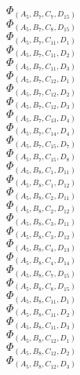\documentclass[14pt]{article}
\begin{document}
    $\Phi_{({A}_{5}, {B}_{7}, {C}_{7}, {D}_{15})}$ \\ 
    $\Phi_{({A}_{5}, {B}_{7}, {C}_{8}, {D}_{15})}$ \\ 
    $\Phi_{({A}_{5}, {B}_{7}, {C}_{11}, {D}_{1})}$ \\ 
    $\Phi_{({A}_{5}, {B}_{7}, {C}_{11}, {D}_{2})}$ \\ 
    $\Phi_{({A}_{5}, {B}_{7}, {C}_{11}, {D}_{3})}$ \\ 
    $\Phi_{({A}_{5}, {B}_{7}, {C}_{12}, {D}_{1})}$ \\ 
    $\Phi_{({A}_{5}, {B}_{7}, {C}_{12}, {D}_{2})}$ \\ 
    $\Phi_{({A}_{5}, {B}_{7}, {C}_{12}, {D}_{3})}$ \\ 
    $\Phi_{({A}_{5}, {B}_{7}, {C}_{13}, {D}_{4})}$ \\ 
    $\Phi_{({A}_{5}, {B}_{7}, {C}_{14}, {D}_{4})}$ \\ 
    $\Phi_{({A}_{5}, {B}_{7}, {C}_{15}, {D}_{7})}$ \\ 
    $\Phi_{({A}_{5}, {B}_{7}, {C}_{15}, {D}_{8})}$ \\ 
    $\Phi_{({A}_{5}, {B}_{8}, {C}_{1}, {D}_{11})}$ \\ 
    $\Phi_{({A}_{5}, {B}_{8}, {C}_{1}, {D}_{12})}$ \\ 
    $\Phi_{({A}_{5}, {B}_{8}, {C}_{2}, {D}_{11})}$ \\ 
    $\Phi_{({A}_{5}, {B}_{8}, {C}_{2}, {D}_{12})}$ \\ 
    $\Phi_{({A}_{5}, {B}_{8}, {C}_{3}, {D}_{11})}$ \\ 
    $\Phi_{({A}_{5}, {B}_{8}, {C}_{3}, {D}_{12})}$ \\ 
    $\Phi_{({A}_{5}, {B}_{8}, {C}_{4}, {D}_{13})}$ \\ 
    $\Phi_{({A}_{5}, {B}_{8}, {C}_{4}, {D}_{14})}$ \\ 
    $\Phi_{({A}_{5}, {B}_{8}, {C}_{7}, {D}_{15})}$ \\ 
    $\Phi_{({A}_{5}, {B}_{8}, {C}_{8}, {D}_{15})}$ \\ 
    $\Phi_{({A}_{5}, {B}_{8}, {C}_{11}, {D}_{1})}$ \\ 
    $\Phi_{({A}_{5}, {B}_{8}, {C}_{11}, {D}_{2})}$ \\ 
    $\Phi_{({A}_{5}, {B}_{8}, {C}_{11}, {D}_{3})}$ \\ 
    $\Phi_{({A}_{5}, {B}_{8}, {C}_{12}, {D}_{1})}$ \\ 
    $\Phi_{({A}_{5}, {B}_{8}, {C}_{12}, {D}_{2})}$ \\ 
    $\Phi_{({A}_{5}, {B}_{8}, {C}_{12}, {D}_{3})}$ \\ 
\end{document}
